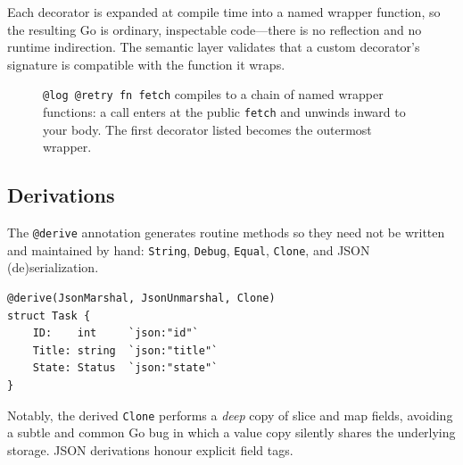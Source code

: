 \documentclass[11pt,a4paper]{article}
\begin{document}
Each decorator is expanded at compile time into a named wrapper function, so the
resulting Go is ordinary, inspectable code---there is no reflection and no
runtime indirection. The semantic layer validates that a custom decorator's
signature is compatible with the function it wraps.

\begin{figure}[ht]
\centering
{}
\caption{\texttt{@log @retry fn fetch} compiles to a chain of named wrapper
functions: a call enters at the public \texttt{fetch} and unwinds inward to your
body. The first decorator listed becomes the outermost wrapper.}
\label{fig:decor}
\end{figure}

\subsection{Derivations}
The \texttt{@derive} annotation generates routine methods so they need not be
written and maintained by hand: \texttt{String}, \texttt{Debug}, \texttt{Equal},
\texttt{Clone}, and JSON (de)serialization.

\begin{lstlisting}[language=GoPlus,caption={Deriving boilerplate methods.}]
@derive(JsonMarshal, JsonUnmarshal, Clone)
struct Task {
    ID:    int     `json:"id"`
    Title: string  `json:"title"`
    State: Status  `json:"state"`
}
\end{lstlisting}

Notably, the derived \texttt{Clone} performs a \emph{deep} copy of slice and map
fields, avoiding a subtle and common Go bug in which a value copy silently shares
the underlying storage. JSON derivations honour explicit field tags.
\end{document}
